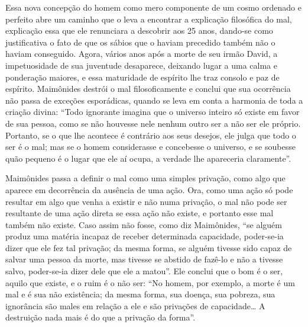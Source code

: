 Essa nova concepção do homem como mero componente de um cosmo ordenado e
perfeito abre um caminho que o leva a encontrar a explicação filosófica
do mal, explicação essa que ele renunciara a descobrir aos 25 anos,
dando-se como justificativa o fato de que os sábios que o haviam
precedido também não o haviam conseguido. Agora, vários anos após a
morte de seu irmão David, a impetuosidade de sua juventude desaparece,
deixando lugar a uma calma e ponderação maiores, e essa maturidade de
espírito lhe traz consolo e paz de espírito. Maimônides destrói o mal
filosoficamente e conclui que sua ocorrência não passa de exceções
esporádicas, quando se leva em conta a harmonia de toda a criação
divina: ``Todo ignorante imagina que o universo inteiro só existe em favor de sua pessoa, como se não houvesse nele nenhum
outro ser a não ser ele próprio. Portanto, se o que lhe acontece é
contrário aos seus desejos, ele julga que todo o ser é o mal; mas se o
homem considerasse e concebesse o universo, e se soubesse quão pequeno é
o lugar que ele aí ocupa, a verdade lhe apareceria claramente''.

Maimônides passa a definir o mal como uma simples privação, como algo
que aparece em decorrência da ausência de uma ação. Ora, como uma ação
só pode resultar em algo que venha a existir e não numa privação, o mal
não pode ser resultante de uma ação direta se essa ação não existe, e
portanto esse mal também não existe. Caso assim não fosse, como diz
Maimônides, ``se alguém produz uma matéria incapaz de receber
determinada capacidade, poder-se-ia dizer que ele fez tal privação; da
mesma forma, se alguém tivesse sido capaz de salvar uma pessoa da
morte, mas tivesse se abstido de fazê-lo e não a tivesse salvo,
poder-se-ia dizer dele que ele a matou''. Ele conclui que o bom é o ser,
aquilo que existe, e o ruim é o não ser: ``No homem, por exemplo, a
morte é um mal e é sua não existência; da mesma forma, sua doença, sua
pobreza, sua ignorância são males em relação a ele e são privações de
capacidade\ldots{} A destruição nada mais é do que a privação da forma''.

